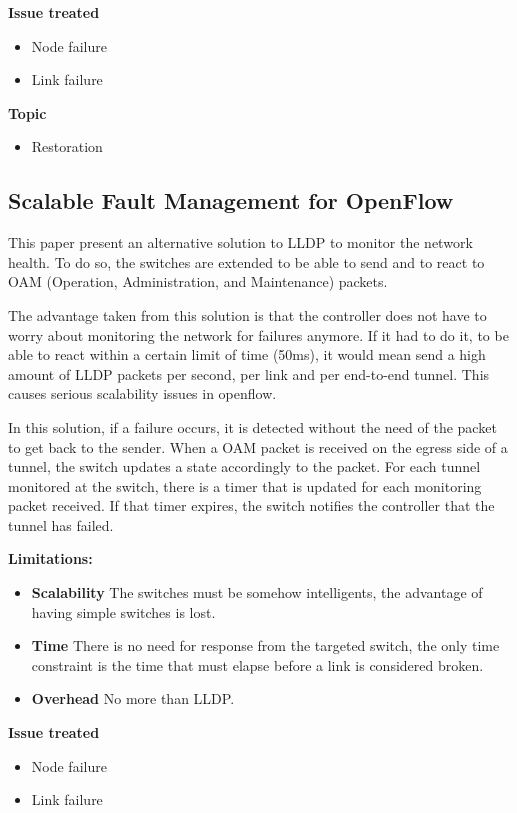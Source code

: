 \documentclass[compsoc]{IEEEtran}
\begin{document}
\textbf{Issue treated}
\begin{itemize}
	\item Node failure
	\item Link failure
\end{itemize}

\textbf{Topic}
\begin{itemize}
	\item Restoration
\end{itemize}

\subsection{Scalable Fault Management for OpenFlow \cite{6364688}}
This paper present an alternative solution to LLDP to monitor the network health. To do so, the switches are extended to be able to send and to react to OAM (Operation, Administration, and Maintenance) packets.

The advantage taken from this solution is that the controller does not have to worry about monitoring the network for failures anymore. If it had to do it, to be able to react within a certain limit of time (50ms), it would mean send a high amount of LLDP packets per second, per link and per end-to-end tunnel. This causes serious scalability issues in openflow.

In this solution, if a failure occurs, it is detected without the need of the packet to get back to the sender. When a OAM packet is received on the egress side of a tunnel, the switch updates a state accordingly to the packet. For each tunnel monitored at the switch, there is a timer that is updated for each monitoring packet received. If that timer expires, the switch notifies the controller that the tunnel has failed.

\textbf{Limitations:}
\begin{itemize}
	\item \textbf{Scalability} The switches must be somehow intelligents, the advantage of having simple switches is lost.
	\item \textbf{Time} There is no need for response from the targeted switch, the only time constraint is the time that must elapse before a link is considered broken.
	\item \textbf{Overhead} No more than LLDP.
\end{itemize}

\textbf{Issue treated}
\begin{itemize}
	\item Node failure
	\item Link failure
\end{itemize}
\end{document}
